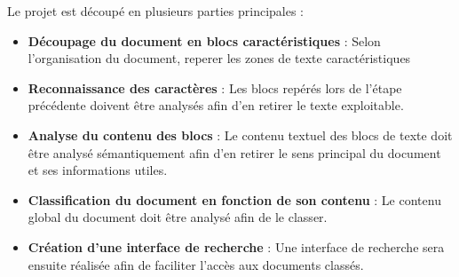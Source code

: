 
Le projet est découpé en plusieurs parties principales :
\begin {itemize}
\item \textbf {Découpage du document en blocs caractéristiques} :
Selon l'organisation du document, reperer les zones de texte caractéristiques
\\
\item \textbf {Reconnaissance des caractères} :
Les blocs repérés lors de l'étape précédente doivent être analysés afin d'en retirer le texte exploitable.
\\
\item \textbf {Analyse du contenu des blocs} :
Le contenu textuel des blocs de texte doit être analysé sémantiquement afin d'en retirer le sens principal du document et ses informations utiles. 
\\
\item \textbf {Classification du document en fonction de son contenu} :
Le contenu global du document doit être analysé afin de le classer.
\\
\item \textbf{Création d'une interface de recherche} :
Une interface de recherche sera ensuite réalisée afin de faciliter l'accès aux documents classés.
\\
\end {itemize}




